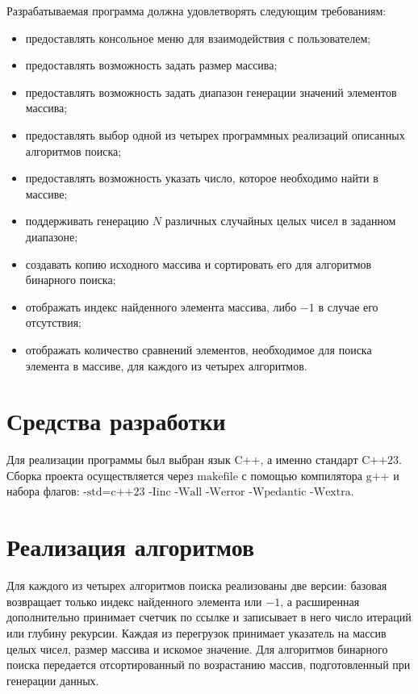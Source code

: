 Разрабатываемая программа должна удовлетворять следующим требованиям:
\begin{itemize}
    \item предоставлять консольное меню для взаимодействия с пользователем;
    \item предоставлять возможность задать размер массива;
    \item предоставлять возможность задать диапазон генерации значений элементов массива;
    \item предоставлять выбор одной из четырех программных реализаций описанных алгоритмов поиска;
    \item предоставлять возможность указать число, которое необходимо найти в массиве;
    \item поддерживать генерацию $N$ различных случайных целых чисел в заданном диапазоне;
    \item создавать копию исходного массива и сортировать его для алгоритмов бинарного поиска;
    \item отображать индекс найденного элемента массива, либо $-1$ в случае его отсутствия;
    \item отображать количество сравнений элементов, необходимое для поиска элемента в массиве, для каждого из четырех алгоритмов.
\end{itemize}

\section{Средства разработки}

Для реализации программы был выбран язык $\text{C++}$, а именно 
стандарт $\text{C++23}$. Сборка проекта осуществляется 
через $\text{makefile}$ с помощью компилятора $\text{g++}$ и набора 
флагов: $\text{-std=c++23 -Iinc -Wall -Werror -Wpedantic -Wextra}$.

\section{Реализация алгоритмов}

Для каждого из четырех алгоритмов поиска реализованы
две версии: базовая возвращает только индекс найденного 
элемента или $-1$, а расширенная дополнительно принимает счетчик 
по ссылке и записывает в него число итераций или глубину рекурсии. 
Каждая из перегрузок принимает указатель на массив 
целых чисел, размер массива и искомое значение. Для 
алгоритмов бинарного поиска передается отсортированный 
по возрастанию массив, подготовленный при генерации данных.


